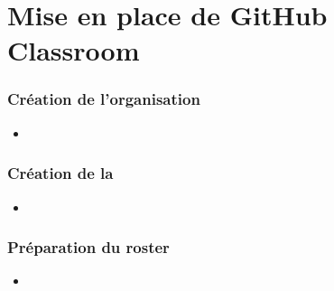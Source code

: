 \section{Mise en place de GitHub Classroom}

\begin{frame}
\frametitle{Création de l'organisation}

\begin{itemize}
	\item	<1->

\end{itemize}

\end{frame}


\begin{frame}
\frametitle{Création de la }

\begin{itemize}
	\item	<1->

\end{itemize}

\end{frame}

\begin{frame}
\frametitle{Préparation du roster}

\begin{itemize}
	\item	<1->	
\end{itemize}

\end{frame}
